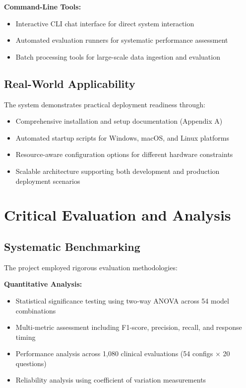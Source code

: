\textbf{Command-Line Tools:}
\begin{itemize}
    \item Interactive CLI chat interface for direct system interaction
    \item Automated evaluation runners for systematic performance assessment
    \item Batch processing tools for large-scale data ingestion and evaluation
\end{itemize}

\subsection{Real-World Applicability}
The system demonstrates practical deployment readiness through:
\begin{itemize}
    \item Comprehensive installation and setup documentation (Appendix A)
    \item Automated startup scripts for Windows, macOS, and Linux platforms
    \item Resource-aware configuration options for different hardware constraints
    \item Scalable architecture supporting both development and production deployment scenarios
\end{itemize}

\section{Critical Evaluation and Analysis}

\subsection{Systematic Benchmarking}
The project employed rigorous evaluation methodologies:

\textbf{Quantitative Analysis:}
\begin{itemize}
    \item Statistical significance testing using two-way ANOVA across 54 model combinations
    \item Multi-metric assessment including F1-score, precision, recall, and response timing
    \item Performance analysis across 1,080 clinical evaluations (54 configs × 20 questions)
    \item Reliability analysis using coefficient of variation measurements
\end{itemize}

